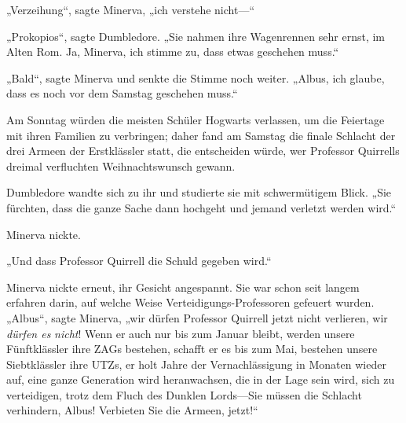 „Verzeihung“, sagte Minerva, „ich verstehe nicht—“

„Prokopios“, sagte Dumbledore. „Sie nahmen ihre Wagenrennen sehr ernst, im Alten Rom. Ja, Minerva, ich stimme zu, dass etwas geschehen muss.“

„Bald“, sagte Minerva und senkte die Stimme noch weiter. „Albus, ich glaube, dass es noch vor dem Samstag geschehen muss.“

Am Sonntag würden die meisten Schüler Hogwarts verlassen, um die Feiertage mit ihren Familien zu verbringen; daher fand am Samstag die finale Schlacht der drei Armeen der Erstklässler statt, die entscheiden würde, wer Professor Quirrells dreimal verfluchten Weihnachtswunsch gewann.

Dumbledore wandte sich zu ihr und studierte sie mit schwermütigem Blick. „Sie fürchten, dass die ganze Sache dann hochgeht und jemand verletzt werden wird.“

Minerva nickte.

„Und dass Professor Quirrell die Schuld gegeben wird.“

Minerva nickte erneut, ihr Gesicht angespannt. Sie war schon seit langem erfahren darin, auf welche Weise Verteidigungs-Professoren gefeuert wurden. „Albus“, sagte Minerva, „wir dürfen Professor Quirrell jetzt nicht verlieren, wir \emph{dürfen es} \emph{nicht}! Wenn er auch nur bis zum Januar bleibt, werden unsere Fünftklässler ihre ZAGs bestehen, schafft er es bis zum Mai, bestehen unsere Siebtklässler ihre UTZs, er holt Jahre der Vernachlässigung in Monaten wieder auf, eine ganze Generation wird heranwachsen, die in der Lage sein wird, sich zu verteidigen, trotz dem Fluch des Dunklen Lords—Sie müssen die Schlacht verhindern, Albus! Verbieten Sie die Armeen, jetzt!“

